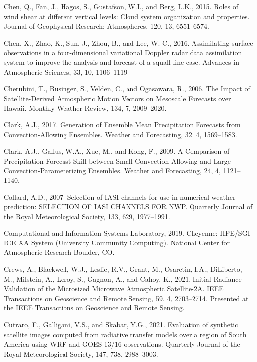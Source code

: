\documentclass[12pt,oneside,a4paper]{reedthesis}
\begin{document}
\leavevmode\hypertarget{ref-chen2015}{}%
Chen, Q., Fan, J., Hagos, S., Gustafson, W.I., and Berg, L.K., 2015. Roles of wind shear at different vertical levels: Cloud system organization and properties. Journal of Geophysical Research: Atmospheres, 120, 13, 6551--6574.

\leavevmode\hypertarget{ref-chen2016}{}%
Chen, X., Zhao, K., Sun, J., Zhou, B., and Lee, W.-C., 2016. Assimilating surface observations in a four-dimensional variational Doppler radar data assimilation system to improve the analysis and forecast of a squall line case. Advances in Atmospheric Sciences, 33, 10, 1106--1119.

\leavevmode\hypertarget{ref-cherubini2006}{}%
Cherubini, T., Businger, S., Velden, C., and Ogasawara, R., 2006. The Impact of Satellite-Derived Atmospheric Motion Vectors on Mesoscale Forecasts over Hawaii. Monthly Weather Review, 134, 7, 2009--2020.

\leavevmode\hypertarget{ref-clark2017}{}%
Clark, A.J., 2017. Generation of Ensemble Mean Precipitation Forecasts from Convection-Allowing Ensembles. Weather and Forecasting, 32, 4, 1569--1583.

\leavevmode\hypertarget{ref-clark2009}{}%
Clark, A.J., Gallus, W.A., Xue, M., and Kong, F., 2009. A Comparison of Precipitation Forecast Skill between Small Convection-Allowing and Large Convection-Parameterizing Ensembles. Weather and Forecasting, 24, 4, 1121--1140.

\leavevmode\hypertarget{ref-collard2007}{}%
Collard, A.D., 2007. Selection of IASI channels for use in numerical weather prediction: SELECTION OF IASI CHANNELS FOR NWP. Quarterly Journal of the Royal Meteorological Society, 133, 629, 1977--1991.

\leavevmode\hypertarget{ref-Cheyenne2019}{}%
Computational and Information Systems Laboratory, 2019. Cheyenne: HPE/SGI ICE XA System (University Community Computing). National Center for Atmospheric Research Boulder, CO.

\leavevmode\hypertarget{ref-crews2021}{}%
Crews, A., Blackwell, W.J., Leslie, R.V., Grant, M., Osaretin, I.A., DiLiberto, M., Milstein, A., Leroy, S., Gagnon, A., and Cahoy, K., 2021. Initial Radiance Validation of the Microsized Microwave Atmospheric Satellite-2A. IEEE Transactions on Geoscience and Remote Sensing, 59, 4, 2703--2714. Presented at the IEEE Transactions on Geoscience and Remote Sensing.

\leavevmode\hypertarget{ref-cutraro2021}{}%
Cutraro, F., Galligani, V.S., and Skabar, Y.G., 2021. Evaluation of synthetic satellite images computed from radiative transfer models over a region of South America using WRF and GOES-13/16 observations. Quarterly Journal of the Royal Meteorological Society, 147, 738, 2988--3003.
\end{document}
